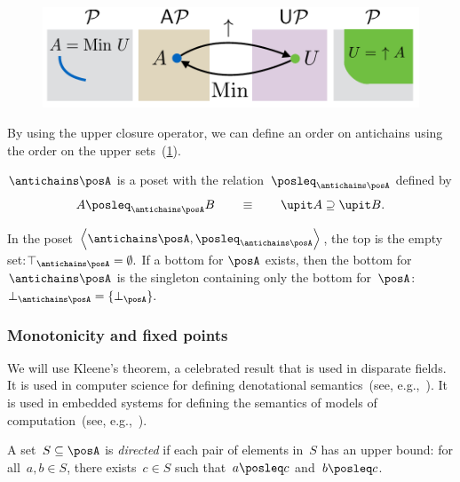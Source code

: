 \begin{figure}[h]
\begin{center}
    \includegraphics[scale=0.4]{papers/arxiv_submission_v6/gmcdp_antichains_upsets.pdf}
\end{center}
\caption{\label{fig:antichains_upsets}}
\end{figure}

By using the upper closure operator, we can define an order on antichains
using the order on the upper sets~(\cref{fig:antichains_upsets}).
\begin{lemma}
\label{lem:antichains-are-poset}$\antichains\posA$ is a poset with
the relation~$\posleq_{\antichains\posA}$ defined by
\[
A\posleq_{\antichains\posA}B\qquad\equiv\qquad\upit A\supseteq\upit B.
\]
\end{lemma}
In the poset $\left\langle \antichains\posA,\posleq_{\antichains\posA}\right\rangle $,
the top is the empty set:$\top_{\antichains\posA}=\emptyset.$ If
a bottom for $\posA$ exists, then the bottom for~$\antichains\posA$
is the singleton containing only the bottom for~$\posA$: $\bot_{\antichains\posA}=\{\bot_{\posA}\}.$


\subsubsection{Monotonicity and fixed points\label{sec:Monotonicity-and-fixed}}

We will use Kleene's theorem, a celebrated result that is used in
disparate fields. It is used in computer science for defining denotational
semantics~(see, e.g.,~\cite{manes86}). It is used in embedded systems
for defining the semantics of models of computation~(see, e.g.,~\cite{lee10}).

\begin{definition}
A set~$S\subseteq\posA$ is \emph{directed} if each pair of elements
in~$S$ has an upper bound: for all~$a,b\in S$, there exists~$c\in S$
such that~$a\posleq c$ and~$b\posleq c$. 
\end{definition}

